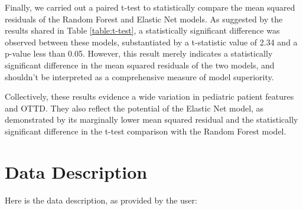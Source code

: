 \documentclass[11pt]{article}
\begin{document}
Finally, we carried out a paired t-test to statistically compare the mean squared residuals of the Random Forest and Elastic Net models. As suggested by the results shared in Table \ref{table:t-test}, a statistically significant difference was observed between these models, substantiated by a t-statistic value of 2.34 and a p-value less than 0.05. However, this result merely indicates a statistically significant difference in the mean squared residuals of the two models, and shouldn't be interpreted as a comprehensive measure of model superiority.

\begin{table}[h]
\caption{Paired T-Test Results for Mean Squared Residuals}
\label{table:t-test}
\begin{threeparttable}
\renewcommand{\TPTminimum}{\linewidth}
\begin{tablenotes}
\footnotesize
\item 
\end{tablenotes}
\end{threeparttable}
\end{table}


Collectively, these results evidence a wide variation in pediatric patient features and OTTD. They also reflect the potential of the Elastic Net model, as demonstrated by its marginally lower mean squared residual and the statistically significant difference in the t-test comparison with the Random Forest model.


\clearpage
\appendix

\section{Data Description} \label{sec:data_description} Here is the data description, as provided by the user:
\end{document}
